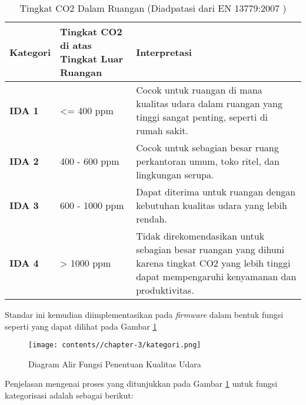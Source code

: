         \begin{table}[h]
        \centering
        \caption{Tingkat CO2 Dalam Ruangan (Diadpatasi dari EN 13779:2007 \cite{EN13779})}
        \label{tab:en13779}
        \begin{tabular}{|l|p{3cm}|p{7cm}|}
        \hline
        \textbf{Kategori} & \textbf{Tingkat CO2 di atas Tingkat Luar Ruangan} & \textbf{Interpretasi} \\ \hline
        \textbf{IDA 1} & <= 400 ppm & Cocok untuk ruangan di mana kualitas udara dalam ruangan yang tinggi sangat penting, seperti di rumah sakit. \\ \hline
        \textbf{IDA 2} & 400 - 600 ppm & Cocok untuk sebagian besar ruang perkantoran umum, toko ritel, dan lingkungan serupa. \\ \hline
        \textbf{IDA 3} & 600 - 1000 ppm  & Dapat diterima untuk ruangan dengan kebutuhan kualitas udara yang lebih rendah. \\ \hline
        \textbf{IDA 4} & > 1000 ppm & Tidak direkomendasikan untuk sebagian besar ruangan yang dihuni karena tingkat CO2 yang lebih tinggi dapat mempengaruhi kenyamanan dan produktivitas. \\ \hline
        \end{tabular}
        \end{table}

        Standar ini kemudian diimplementasikan pada \textit{firmware} dalam bentuk fungsi seperti yang dapat dilihat pada Gambar \ref{fig:kategori}

        \begin{figure}[H]
            \centering
            \texttt{[image: contents//chapter-3/kategori.png]}
            \caption{Diagram Alir Fungsi Penentuan Kualitas Udara}
            \label{fig:kategori}
        \end{figure}

        Penjelasan mengenai proses yang ditunjukkan pada Gambar \ref{fig:kategori} untuk fungsi kategorisasi adalah sebagai berikut:
        
